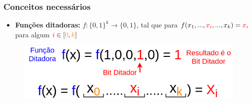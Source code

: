 \documentclass[11pt, handout]{beamer}
\newcommand{\red}[1]{\textcolor{red}{#1}}
\newcommand{\org}[1]{\textcolor{orange}{#1}}
\begin{document}
\begin{frame}[<+->]
\frametitle{Conceitos necessários}
    \begin{itemize}
        \item \textbf{Funções ditadoras:} $f:\{0,1\}^k \xrightarrow\ \{0,1\}$, tal que para $f(x_1,...,\red{x_i},...,x_k)=\red{x_i} $ para algum $\red{i}\in [\org{0},\org{k}]$ \\
    \end{itemize}
    \begin{figure}
            \includegraphics[width=1\textwidth]{images/dictators.png}
    \end{figure}{}
\end{frame}{}
\end{document}
